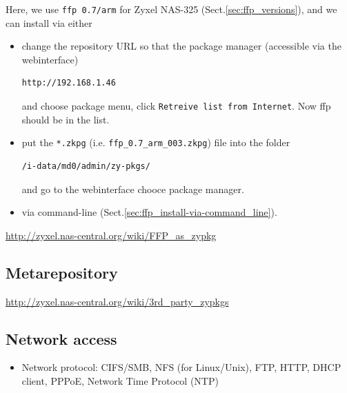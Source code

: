 Here, we use \verb!ffp 0.7/arm! for Zyxel NAS-325
(Sect.\ref{sec:ffp_versions}), and we can install via either
\begin{itemize}
  \item change the repository URL so that the package manager (accessible via
  the webinterface)
\begin{verbatim}
http://192.168.1.46
\end{verbatim}
and choose package menu, click \verb!Retreive list from Internet!.
Now ffp should be in the list. 

  \item put the \verb!*.zkpg! (i.e. \verb!ffp_0.7_arm_003.zkpg!) file into the
  folder
\begin{verbatim}
/i-data/md0/admin/zy-pkgs/
\end{verbatim} 
and go to the webinterface chooce package manager.
  
  \item via command-line (Sect.\ref{sec:ffp_install-via-command_line}).
\end{itemize}
\url{http://zyxel.nas-central.org/wiki/FFP_as_zypkg}

% 


\subsection{Metarepository}
\label{sec:metarepository}

\url{http://zyxel.nas-central.org/wiki/3rd_party_zypkgs}
\subsection{Network access}

\begin{itemize}
  \item Network protocol: CIFS/SMB, NFS (for Linux/Unix), FTP, HTTP, DHCP
  client, PPPoE, Network Time Protocol (NTP)
\end{itemize}


